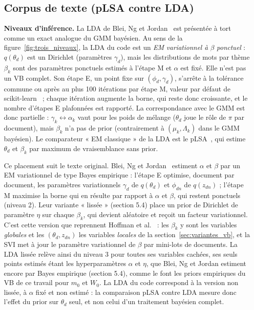 \subsection{Corpus de texte (pLSA contre LDA)}\label{sec:texte_methodo}
\textbf{Niveaux d'inférence. }La LDA de Blei, Ng et Jordan~\cite{blei2003} est présentée à tort comme un exact analogue du GMM bayésien. Au sens de la figure~\ref{fig:trois_niveaux}, la LDA du code est un \emph{EM variationnel à $\beta$ ponctuel} : $q(\theta_d)$ est un Dirichlet (paramètres $\gamma_d$), mais les distributions de mots par thème $\beta_k$ sont des paramètres ponctuels estimés à l'étape M et $\alpha$ est fixé. Elle n'est pas un VB complet. Son étape E, un point fixe sur $(\phi_d, \gamma_d)$, s'arrête à la tolérance commune ou après au plus 100 itérations par étape M, valeur par défaut de scikit-learn~\cite{pedregosa2011} ; chaque itération augmente la borne, qui reste donc croissante, et le nombre d'étapes E plafonnées est rapporté. La correspondance avec le GMM est donc partielle : $\gamma_k \leftrightarrow \alpha_k$ vaut pour les poids de mélange ($\theta_d$ joue le rôle de $\pi$ par document), mais $\beta_k$ n'a pas de prior (contrairement à $(\mu_k,\Lambda_k)$ dans le GMM bayésien). Le comparateur « EM classique » de la LDA est le pLSA~\cite{hofmann1999}, qui estime $\theta_d$ et $\beta_k$ par maximum de vraisemblance sans prior.

Ce placement suit le texte original. Blei, Ng et Jordan~\cite[section~5.3]{blei2003} estiment $\alpha$ et $\beta$ par un EM variationnel de type Bayes empirique : l'étape E optimise, document par document, les paramètres variationnels $\gamma_d$ de $q(\theta_d)$ et $\phi_{dn}$ de $q(z_{dn})$ ; l'étape M maximise la borne qui en résulte par rapport à $\alpha$ et $\beta$, qui restent ponctuels (niveau 2). Leur variante « lissée » (section 5.4) place un prior de Dirichlet de paramètre $\eta$ sur chaque $\beta_k$, qui devient aléatoire et reçoit un facteur variationnel. C'est cette version que reprennent Hoffman et al.~\cite{hoffman2013} : les $\beta_k$ y sont les variables \emph{globales} et les $(\theta_d, z_{dn})$ les variables \emph{locales} de la section~\ref{sec:variantes_vb}, et la SVI met à jour le paramètre variationnel de $\beta$ par mini-lots de documents. La LDA lissée relève ainsi du niveau 3 pour toutes ses variables cachées, ses seuls points estimés étant les hyperparamètres $\alpha$ et $\eta$, que Blei, Ng et Jordan estiment encore par Bayes empirique (section 5.4), comme le font les priors empiriques du VB de ce travail pour $m_0$ et $W_0$. La LDA du code correspond à la version non lissée, à $\alpha$ fixé et non estimé : la comparaison pLSA contre LDA mesure donc l'effet du prior sur $\theta_d$ seul, et non celui d'un traitement bayésien complet.

